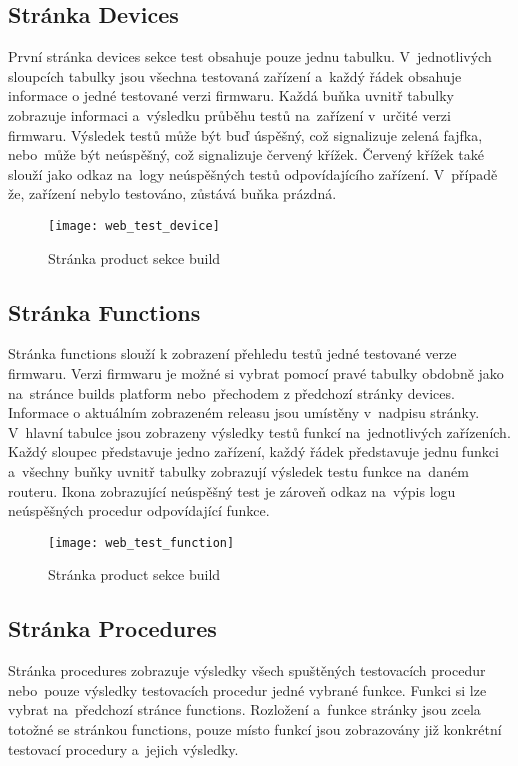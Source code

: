 \subsection{Stránka Devices}
První stránka devices sekce test obsahuje pouze jednu tabulku. V~jednotlivých sloupcích tabulky jsou všechna testovaná zařízení a~každý řádek obsahuje informace o jedné testované verzi firmwaru. Každá buňka uvnitř tabulky zobrazuje informaci a~výsledku průběhu testů na~zařízení v~určité verzi firmwaru. Výsledek testů může být buď úspěšný, což signalizuje zelená fajfka, nebo~může být neúspěšný, což signalizuje červený křížek. Červený křížek také slouží jako odkaz na~logy neúspěšných testů odpovídajícího zařízení. V~případě že, zařízení nebylo testováno, zůstává buňka prázdná.

\begin{figure}[h]
  \centering
  \texttt{[image: web\_test\_device]}
  \caption{Stránka product sekce build}
  \label{fig:web_test_device}
\end{figure}

\subsection{Stránka Functions}
Stránka functions slouží k zobrazení přehledu testů jedné testované verze firmwaru. Verzi firmwaru je možné si vybrat pomocí pravé tabulky obdobně jako na~stránce builds platform nebo~přechodem z předchozí stránky devices. Informace o aktuálním zobrazeném releasu jsou umístěny v~nadpisu stránky. V~hlavní tabulce jsou zobrazeny výsledky testů funkcí na~jednotlivých zařízeních. Každý sloupec představuje jedno zařízení, každý řádek představuje jednu funkci a~všechny buňky uvnitř tabulky zobrazují výsledek testu funkce na~daném routeru. Ikona zobrazující neúspěšný test je zároveň odkaz na~výpis logu neúspěšných procedur odpovídající funkce.

\begin{figure}[h]
  \centering
  \texttt{[image: web\_test\_function]}
  \caption{Stránka product sekce build}
  \label{fig:web_test_device}
\end{figure}

\subsection{Stránka Procedures}
Stránka procedures zobrazuje výsledky všech spuštěných testovacích procedur nebo~pouze výsledky testovacích procedur jedné vybrané funkce. Funkci si lze vybrat na~předchozí stránce functions. Rozložení a~funkce stránky jsou zcela totožné se stránkou functions, pouze místo funkcí jsou zobrazovány již konkrétní testovací procedury a~jejich výsledky.

